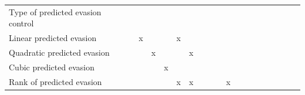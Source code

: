 \begin{tabular}{lcccccccccccccccccc}
            &                     &                     &                     &                     &                     &                     &                     &                     &                     &                     &                     &                     &                     &                     &                     &                     &                     &                     \\
\midrule
Type of predicted evasion control&                     &                     &                     &                     &                     &                     &                     &                     &                     &                     &                     &                     &                     &                     &                     &                     &                     &                     \\
Linear predicted evasion&                     &           x         &                     &                     &           x         &                     &                     &                     &                     &                     &                     &                     &                     &                     &                     &                     &                     &                     \\
Quadratic predicted evasion&                     &                     &           x         &                     &                     &           x         &                     &                     &                     &                     &                     &                     &                     &                     &                     &                     &                     &                     \\
Cubic predicted evasion&                     &                     &                     &           x         &                     &                     &                     &                     &                     &                     &                     &                     &                     &                     &                     &                     &                     &                     \\
Rank of predicted evasion&                     &                     &                     &                     &           x         &           x         &                     &                     &                     &           x         &                     &                     &                     &                     &                     &                     &                     &                     \\

\end{tabular}
